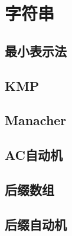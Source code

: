 \documentclass[main.tex]{subfiles}
\begin{document}
\chapter{字符串}
\section{最小表示法}
    
\section{KMP}
    
\section{Manacher}
    
\section{AC自动机}
    
\section{后缀数组}
    
\section{后缀自动机}
    
\end{document}
